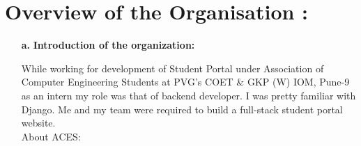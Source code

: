 \documentclass[12pt]{article}
\begin{document}
\section*{Overview of the Organisation :}
\vspace{0.5cm}
\begin{itemize}
  \item[\textbf{a.}] \textbf{Introduction of the organization:}\\
  \bigskip

\hspace{1cm}While working for development of Student Portal under Association of Computer Engineering Students at PVG’s COET \& GKP (W) IOM, Pune-9  as an intern my role was that of  backend developer. I was pretty familiar with Django. Me and my team were required to build a full-stack student portal website.\\
\medskip
\medskip
About ACES:\\
\medskip


\end{itemize}
\end{document}
